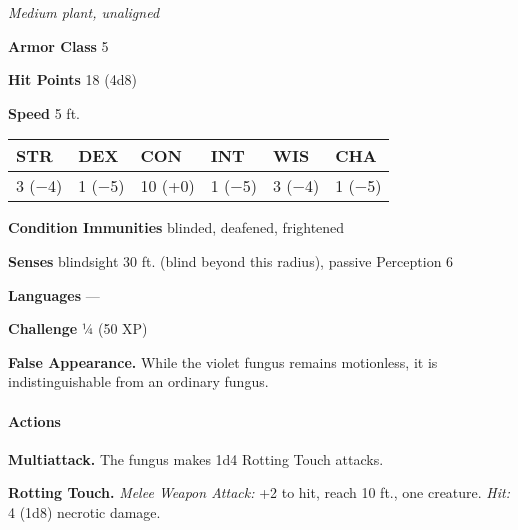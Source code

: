 \documentclass[
]{article}
\begin{document}
\emph{Medium plant, unaligned}

\textbf{Armor Class} 5

\textbf{Hit Points} 18 (4d8)

\textbf{Speed} 5 ft.

\begin{longtable}[]{@{}llllll@{}}
\toprule
STR & DEX & CON & INT & WIS & CHA\tabularnewline
\midrule
\endhead
3 (−4) & 1 (−5) & 10 (+0) & 1 (−5) & 3 (−4) & 1 (−5)\tabularnewline
\bottomrule
\end{longtable}

\textbf{Condition Immunities} blinded, deafened, frightened

\textbf{Senses} blindsight 30 ft. (blind beyond this radius), passive
Perception 6

\textbf{Languages} ---

\textbf{Challenge} ¼ (50 XP)

\textbf{False Appearance.} While the violet fungus remains motionless,
it is indistinguishable from an ordinary fungus.

\hypertarget{actions}{%
\paragraph{Actions}\label{actions}}

\textbf{Multiattack.} The fungus makes 1d4 Rotting Touch attacks.

\textbf{Rotting Touch.} \emph{Melee Weapon Attack:} +2 to hit, reach 10
ft., one creature. \emph{Hit:} 4 (1d8) necrotic damage.
\end{document}

